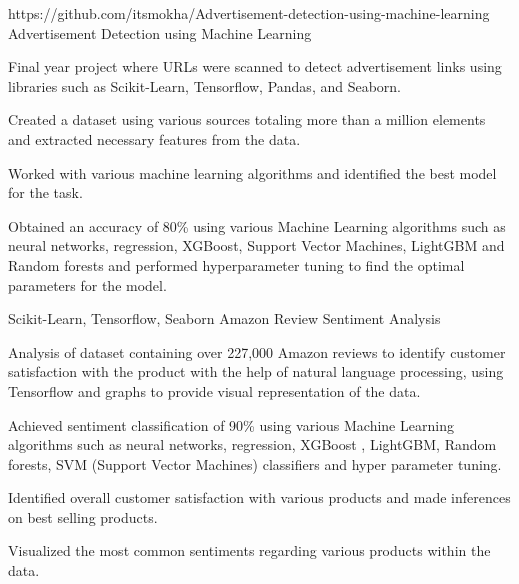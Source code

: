 \begin{cventries}
  \cventry
    {https://github.com/itsmokha/Advertisement-detection-using-machine-learning} %
    {Advertisement Detection using Machine Learning} %
    {}
    {}
    {
      \begin{cvitems} %
		\item Final year project where URLs were scanned to detect advertisement links using libraries such as Scikit-Learn, Tensorflow, Pandas, and Seaborn.
		\item Created a dataset using various sources totaling more than a million elements and extracted necessary features from the data.
		\item Worked with various machine learning algorithms and identified the best model for the task.
		\item Obtained an accuracy of 80\% using various Machine Learning algorithms such as neural networks, regression, XGBoost, Support Vector Machines, LightGBM and Random forests and performed hyperparameter tuning to find the optimal parameters for the model.
      \end{cvitems}
    }

  \cventry
    {Scikit-Learn, Tensorflow, Seaborn} %
    {Amazon Review Sentiment Analysis} %
    {}
    {}
    {
      \begin{cvitems} %
		\item Analysis of dataset containing over 227,000 Amazon reviews to identify customer satisfaction with the product  with the help of natural language processing, using Tensorflow and graphs to provide visual representation of the data.
		\item Achieved sentiment classification of 90\% using various Machine Learning algorithms such as neural networks, regression, XGBoost , LightGBM, Random forests, SVM (Support Vector Machines) classifiers and hyper parameter tuning.
		\item Identified overall customer satisfaction with various products and made inferences on best selling products.
		\item Visualized the most common sentiments regarding various products within the data.
      \end{cvitems}
    }


\end{cventries}
